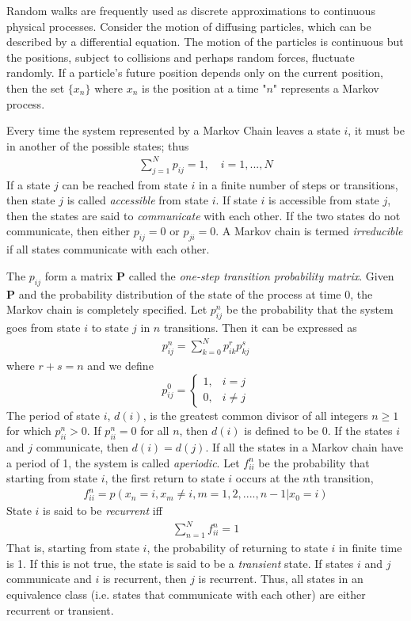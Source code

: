 \documentclass[twoside,english]{uiofysmaster}
\begin{document}
Random walks are frequently used as discrete approximations to continuous physical processes. Consider the motion of diffusing particles, which can be described by a differential equation. The motion of the particles is continuous but the positions, subject to collisions and perhaps random forces, fluctuate randomly. If a particle’s future position depends only on the current position, then the set $\{ x_n \}$ where $x_n$ is the position at a time "$n$" represents a Markov process.

Every time the system represented by a Markov Chain leaves a state $i$, it must be in another of the possible states; thus
\begin{align}
	\sum_{j=1}^N p_{ij} = 1, \quad i=1,...,N
\end{align}
If a state $j$ can be reached from state $i$ in a finite number of steps or transitions, then state $j$ is called \textit{accessible} from state $i$. If state $i$ is accessible from state $j$, then the states are said to \textit{communicate} with each other. If the two states do not communicate, then either $p_{ij}=0$ or $p_{ji}=0$. A Markov chain is termed \textit{irreducible} if all states communicate with each other. 

The $p_{ij}$ form a matrix $\bm{P}$ called the \textit{one-step transition probability matrix}. Given $\bm{P}$ and the probability distribution of the state of the process at time 0, the Markov chain is completely specified. Let $p_{ij}^n$ be the probability that the system goes from state $i$ to state $j$ in $n$ transitions. Then it can be expressed as 
\begin{align}
	p_{ij}^n = \sum_{k=0}^N p_{ik}^r p_{kj}^s
\end{align}
where $r+s = n$ and we define
\[ p_{ij}^0 = \begin{cases}
				 1, & i = j \\
				 0, & i \neq j  
\end{cases} \]
The period of state $i$, $d(i)$, is the greatest common divisor of all integers $n\geq 1$ for which $p_{ii}^n > 0$. If $p_{ii}^n = 0$ for all $n$, then $d(i)$ is defined to be 0. If the states $i$ and $j$ communicate, then $d(i) = d(j)$. If all the states in a Markov chain have a period of 1, the system is called \textit{aperiodic}. Let $f_{ii}^n$ be the probability that starting from state $i$, the first return to state $i$ occurs at the $n$th transition,
\begin{align}
	f_{ii}^n = p(x_n =i, x_m\neq i, m=1,2,...., n-1| x_0 =i)
\end{align}
State $i$ is said to be \textit{recurrent} iff
\begin{align}
	\sum_{n=1}^N f_{ii}^n = 1
\end{align}
That is, starting from state $i$, the probability of returning to state $i$ in finite time is 1. If this is not true, the state is said to be a \textit{transient} state. If states $i$ and $j$ communicate and $i$ is recurrent, then $j$ is recurrent. Thus, all states in an equivalence class (i.e. states that communicate with each other) are either recurrent or transient. 
\end{document}
